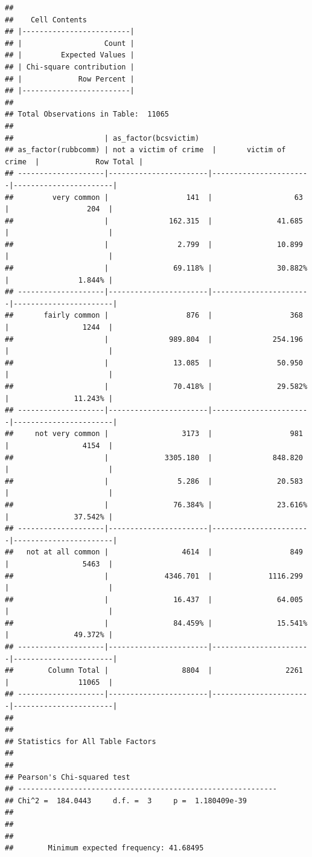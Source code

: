 \documentclass[
]{book}
\begin{document}
\begin{verbatim}
## 
##    Cell Contents
## |-------------------------|
## |                   Count |
## |         Expected Values |
## | Chi-square contribution |
## |             Row Percent |
## |-------------------------|
## 
## Total Observations in Table:  11065 
## 
##                     | as_factor(bcsvictim) 
## as_factor(rubbcomm) | not a victim of crime  |       victim of crime  |             Row Total | 
## --------------------|-----------------------|-----------------------|-----------------------|
##         very common |                  141  |                   63  |                  204  | 
##                     |              162.315  |               41.685  |                       | 
##                     |                2.799  |               10.899  |                       | 
##                     |               69.118% |               30.882% |                1.844% | 
## --------------------|-----------------------|-----------------------|-----------------------|
##       fairly common |                  876  |                  368  |                 1244  | 
##                     |              989.804  |              254.196  |                       | 
##                     |               13.085  |               50.950  |                       | 
##                     |               70.418% |               29.582% |               11.243% | 
## --------------------|-----------------------|-----------------------|-----------------------|
##     not very common |                 3173  |                  981  |                 4154  | 
##                     |             3305.180  |              848.820  |                       | 
##                     |                5.286  |               20.583  |                       | 
##                     |               76.384% |               23.616% |               37.542% | 
## --------------------|-----------------------|-----------------------|-----------------------|
##   not at all common |                 4614  |                  849  |                 5463  | 
##                     |             4346.701  |             1116.299  |                       | 
##                     |               16.437  |               64.005  |                       | 
##                     |               84.459% |               15.541% |               49.372% | 
## --------------------|-----------------------|-----------------------|-----------------------|
##        Column Total |                 8804  |                 2261  |                11065  | 
## --------------------|-----------------------|-----------------------|-----------------------|
## 
##  
## Statistics for All Table Factors
## 
## 
## Pearson's Chi-squared test 
## ------------------------------------------------------------
## Chi^2 =  184.0443     d.f. =  3     p =  1.180409e-39 
## 
## 
##  
##        Minimum expected frequency: 41.68495
\end{verbatim}
\end{document}
